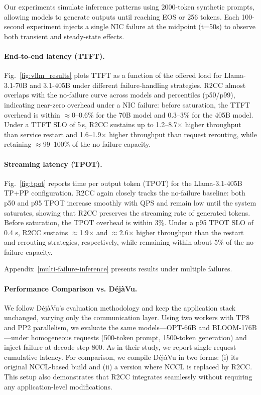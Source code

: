 \documentclass[letterpaper,twocolumn,10pt]{article}
\begin{document}
Our experiments simulate inference patterns using 2000-token synthetic prompts, allowing models to generate outputs until reaching EOS or 256 tokens. Each 100-second experiment injects a single NIC failure at the midpoint (t=50s) to observe both transient and steady-state effects.

\paragraph{End-to-end latency (TTFT).}
Fig.~\ref{fig:vllm_results} plots TTFT as a function of the offered load for Llama-3.1-70B and 3.1-405B under different failure-handling strategies.
R2CC almost overlaps with the no-failure curve across models and percentiles (p50/p99),
indicating near-zero overhead under a NIC failure: before saturation, the TTFT overhead is within $\approx$0--0.6\% for the 70B model and 0.3--3\% for the 405B model.
Under a TTFT SLO of 5\,s, R2CC sustains up to 1.2--8.7$\times$ higher throughput than service restart and 1.6--1.9$\times$ higher throughput than request rerouting, while retaining $\approx$99–100\% of the no-failure capacity.

\paragraph{Streaming latency (TPOT).}
Fig.~\ref{fig:tpot} reports time per output token (TPOT) for the Llama-3.1-405B TP+PP configuration.
R2CC again closely tracks the no-failure baseline: both p50 and p95 TPOT increase smoothly with QPS and remain low until the system saturates, showing that R2CC preserves the streaming rate of generated tokens.
Before saturation, the TPOT overhead is within 3\%.
Under a p95 TPOT SLO of 0.4 s, R2CC sustains $\approx$1.9× and $\approx$2.6× higher throughput than the restart and rerouting strategies, respectively, while remaining within about 5\% of the no-failure capacity.

Appendix~\ref{multi-failure-inference} presents results under multiple failures.

\paragraph{Performance Comparison vs. DéjàVu.}
We follow DéjàVu's evaluation methodology and keep the application stack unchanged, varying only the communication layer. Using two workers with TP8 and PP2 parallelism, we evaluate the same models—OPT-66B and BLOOM-176B—under homogeneous requests (500-token prompt, 1500-token generation) and inject failure at decode step 800. As in their study, we report single-request cumulative latency. For comparison, we compile DéjàVu in two forms: (i) its original NCCL-based build and (ii) a version where NCCL is replaced by R2CC. This setup also demonstrates that R2CC integrates seamlessly without requiring any application-level modifications.
\end{document}
